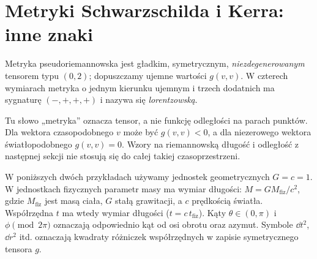 \section{Metryki Schwarzschilda i Kerra: inne znaki}
\label{sec:metryki-lorentzowskie}

\begin{definicja}
\label{def:metryka-lorentzowska}
Metryka pseudoriemannowska jest gładkim,
symetrycznym, \emph{niezdegenerowanym} tensorem
typu $(0,2)$; dopuszczamy ujemne wartości $g(v,v)$.
W czterech wymiarach metryka o jednym kierunku
ujemnym i trzech dodatnich ma sygnaturę $(-,+,+,+)$
i nazywa się \emph{lorentzowską}.
\end{definicja}

Tu słowo „metryka” oznacza tensor, a nie funkcję
odległości na parach punktów. Dla wektora
czasopodobnego $v$ może być $g(v,v)<0$, a dla
niezerowego wektora światłopodobnego $g(v,v)=0$.
Wzory na riemannowską długość i odległość
z następnej sekcji nie stosują się do całej
takiej czasoprzestrzeni.

W poniższych dwóch przykładach używamy jednostek
geometrycznych $G=c=1$. W jednostkach fizycznych
parametr masy ma wymiar długości:
$M=G M_{\mathrm{fiz}}/c^2$, gdzie
$M_{\mathrm{fiz}}$ jest masą ciała, $G$ stałą
grawitacji, a $c$ prędkością światła. Współrzędna
$t$ ma wtedy wymiar długości ($t=c\,t_{\mathrm{fiz}}$).
Kąty $\theta\in(0,\pi)$ i $\phi\pmod{2\pi}$
oznaczają odpowiednio kąt od osi obrotu oraz azymut.
Symbole $\dd t^2$, $\dd r^2$ itd. oznaczają
kwadraty różniczek współrzędnych w zapisie
symetrycznego tensora $g$.

